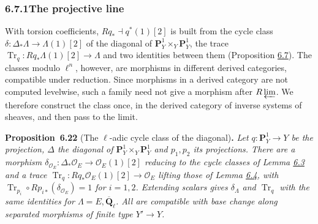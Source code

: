 \documentclass[11pt]{article}
\newenvironment{bpstatement}[2]{\par\addvspace{0.6\baselineskip}\noindent\textbf{#1}#2\textbf{.}\enspace\ignorespaces}
  {\par\addvspace{0.4\baselineskip}}
\newenvironment{bpstatementit}[2]{\begin{bpstatement}{#1}{#2}\itshape\ignorespaces}{\end{bpstatement}}
\begin{document}
\subsubsection*{\texorpdfstring{6.7.1\quad The projective line}{6.7.1 The projective line}}
\label{bp579}%
\label{bp580}%
With torsion coefficients, \(Rq_*\dashv q^*(1)[2]\) is built from the cycle class \(\delta:\Delta_*\Lambda\to\Lambda(1)[2]\) of the diagonal of \(\mathbf P^1_Y\times_Y\mathbf P^1_Y\), the trace \(\operatorname{Tr}_q:Rq_*\Lambda(1)[2]\to\Lambda\) and two identities between them (Proposition \hyperref[bp534]{6.7}). The classes modulo \(\ell^n\), however, are morphisms in different derived categories, compatible under reduction. Since morphisms in a derived category are not computed levelwise, such a family need not give a morphism after \(R\varprojlim\). We therefore construct the class once, in the derived category of inverse systems of sheaves, and then pass to the limit.

\label{bp581}%
\begin{bpstatementit}{Proposition~6.22}{ (The $\ell$-adic cycle class of the diagonal)}
Let \(q:\mathbf P^1_Y\to Y\) be the projection, \(\Delta\) the diagonal of \(\mathbf P^1_Y\times_Y\mathbf P^1_Y\) and \(p_1,p_2\) its projections. There are a morphism \(\delta_{\mathcal O_E}:\Delta_*\mathcal O_E\to
\mathcal O_E(1)[2]\) reducing to the cycle classes of Lemma \hyperref[bp523]{6.3} and a trace \(\operatorname{Tr}_q:Rq_*\mathcal O_E(1)[2]\to\mathcal O_E\) lifting those of Lemma \hyperref[bp526]{6.4}, with \(\operatorname{Tr}_{p_i}\circ Rp_{i*}(\delta_{\mathcal O_E})=1\) for \(i=1,2\). Extending scalars gives \(\delta_\Lambda\) and \(\operatorname{Tr}_q\) with the same identities for \(\Lambda=E,\overline{\mathbf Q}_\ell\). All are compatible with base change along separated morphisms of finite type \(Y'\to Y\).
\end{bpstatementit}
\end{document}
